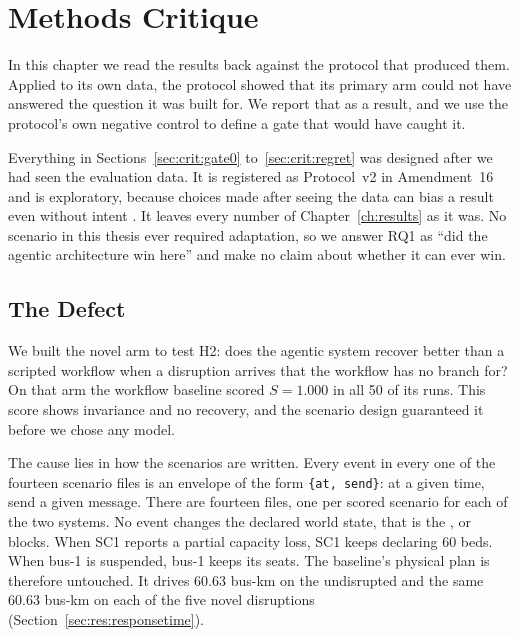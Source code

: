 \chapter{Methods Critique}
\label{ch:critique}

%

In this chapter we read the results back against the protocol that produced
them. Applied to its own data, the protocol showed that its primary arm could
not have answered the question it was built for. We report that as a result,
and we use the protocol's own negative control to define a gate that would
have caught it.

Everything in Sections~\ref{sec:crit:gate0} to~\ref{sec:crit:regret} was
designed after we had seen the evaluation data. It is registered as
Protocol~v2 in Amendment~16 and is exploratory, because choices made after
seeing the data can bias a result even without intent \parencite{gelman2014}.
It leaves every number of Chapter~\ref{ch:results} as it was. No scenario in
this thesis ever required adaptation, so we answer RQ1 as ``did the agentic
architecture win here'' and make no claim about whether it can ever win.

\section{The Defect}
\label{sec:crit:defect}

We built the novel arm to test H2: does the agentic system recover better than
a scripted workflow when a disruption arrives that the workflow has no branch
for? On that arm the workflow baseline scored $S = 1.000$ in all 50 of its
runs. This score shows invariance and no recovery, and the scenario design
guaranteed it before we chose any model.

The cause lies in how the scenarios are written. Every event in every one of
the fourteen scenario files is an envelope of the form \texttt{\{at, send\}}:
at a given time, send a given message. There are fourteen files, one per
scored scenario for each of the two systems. No event changes the declared world
state, that is the ,  or  blocks. When
SC1 reports a partial capacity loss, SC1 keeps declaring 60 beds. When bus-1 is
suspended, bus-1 keeps its seats. The baseline's physical plan is therefore
untouched. It drives 60.63 bus-km on the undisrupted  and the
same 60.63 bus-km on each of the five novel disruptions
(Section~\ref{sec:res:responsetime}).

